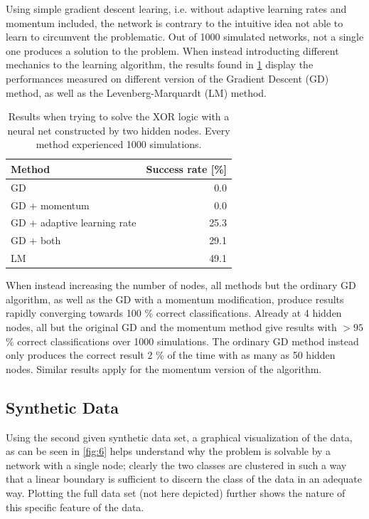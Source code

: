 \documentclass[a4paper,12pt]{article}
\theoremstyle{plain}
\theoremstyle{definition}
\begin{document}
      Using simple gradient descent learing, i.e. without adaptive learning
      rates and momentum included, the network is contrary to the intuitive idea
      not able to learn to circumvent the problematic. Out of 1000 simulated networks, not a
      single one produces a solution to the problem. When instead
      introducting different mechanics to the learning algorithm, the results
      found in \cref{tab:xor} display the performances measured on different
      version of the Gradient Descent (GD) method, as well as the
      Levenberg-Marquardt (LM) method. 

      \begin{table}[H]
         \centering
         \begin{tabular}{lr}
            \toprule
            \textbf{Method} & \textbf{Success rate [\%]}\\ 
            \midrule
            GD & 0.0 \\
            GD + momentum & 0.0 \\
            GD + adaptive learning rate & 25.3 \\
            GD + both & 29.1 \\
            LM & 49.1 \\ \bottomrule
         \end{tabular}
         \caption{Results when trying to solve the XOR logic with a neural net
         constructed by two hidden nodes. Every method experienced 1000
      simulations.}
         \label{tab:xor}
      \end{table}

      When instead increasing the number of nodes, all methods but the ordinary
      GD algorithm, as well as the GD with a momentum modification, produce results 
      rapidly converging towards 100 \% correct
      classifications. Already at 4 hidden nodes, all but the original GD and
      the momentum method
      give results with $>$$95$ \% correct classifications over 1000 simulations.
      The ordinary GD method instead only produces the correct result 2 \% of the
      time with as many as 50 hidden nodes. Similar results apply for the
      momentum version of the algorithm. 
      
  \subsection{Synthetic Data} 
      Using the second given synthetic data set, a graphical visualization of the data, as
      can be seen in \cref{fig:6} helps understand why the problem is solvable
      by a network with a single node; clearly the two classes are clustered in
      such a way that a linear boundary is sufficient to discern the class of
      the data in an adequate way. Plotting the full data set (not here
      depicted) further shows the nature of this specific feature of the data. 
\end{document}

